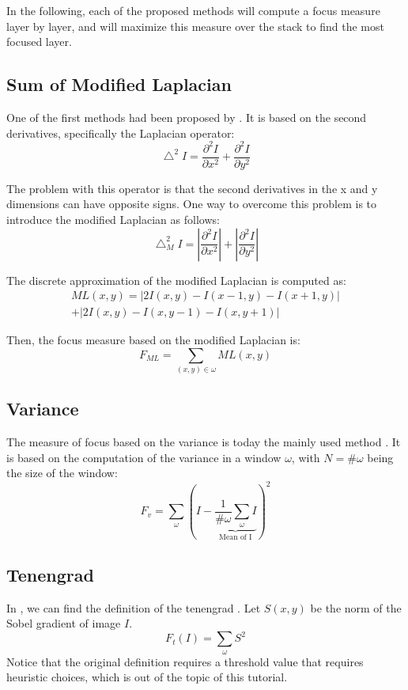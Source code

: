 In the following, each of the proposed methods will compute a focus measure layer by layer, and will maximize this measure over the stack to find the most focused layer. 

\subsection{Sum of Modified Laplacian}
One of the first methods had been proposed by \cite{Nayar1994}. It is based on the second derivatives, specifically the Laplacian operator:
$$\bigtriangleup^2 I = \frac{\partial^2 I}{\partial x^2} + \frac{\partial^2 I}{\partial y^2}$$

The problem with this operator is that the second derivatives in the x and y dimensions can have opposite signs. One way to overcome this problem is to introduce the modified Laplacian as follows:
$$\bigtriangleup_M^2 I = \left|\frac{\partial^2 I}{\partial x^2}\right| + \left|\frac{\partial^2 I}{\partial y^2}\right|$$

The discrete approximation of the modified Laplacian is computed as:
\begin{multline}ML(x, y)= \left| 2I(x,y)-I(x-1, y)-I(x+1,y)\right| \\
+ \left| 2I(x,y)-I(x, y-1)-I(x,y+1)\right|
\end{multline}
                                                                                                             

Then, the focus measure based on the modified Laplacian is:
$$F_{ML} = \displaystyle{\sum_{(x,y)\in\omega}}ML(x,y)$$

\subsection{Variance}
The measure of focus based on the variance is today the mainly used method \cite{Groen1985,Sugimoto1985}. It is based on the computation of the variance in a window $\omega$, with $N=\#\omega$ being the size of the window:
$$F_v=\displaystyle{\sum_\omega} \left( I -\underbrace{\frac{1}{\#\omega} \displaystyle{\sum_\omega} I}_{\textrm{Mean of I}}\right)^2$$

\subsection{Tenengrad}
In \cite{Krotkov1988}, we can find the definition of the tenengrad \cite{Tenenbaum1970}. Let $S(x,y)$ be the norm of the Sobel gradient of image $I$.
$$F_t(I)=\displaystyle\sum_\omega S^2$$
Notice that the original definition requires a threshold value that requires heuristic choices, which is out of the topic of this tutorial.

